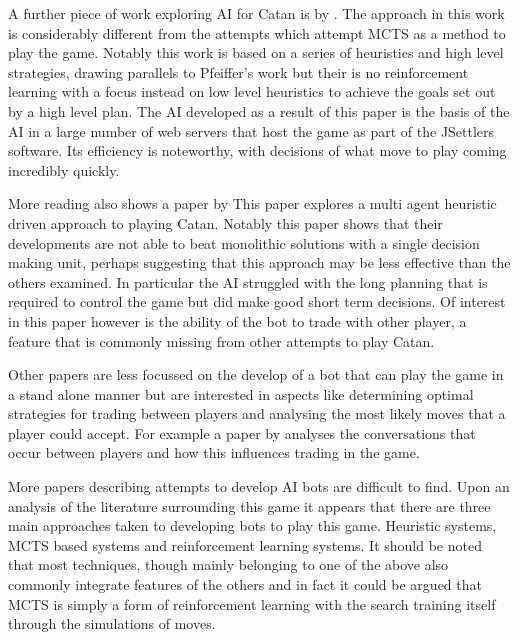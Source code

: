 \documentclass[]{article}
\begin{document}
\par A further piece of work exploring AI for Catan is by \textcite{thomas2003real}. The approach in this work is considerably different from the attempts which attempt MCTS as a method to play the game. Notably this work is based on a series of heuristics and high level strategies, drawing parallels to Pfeiffer's work but their is no reinforcement learning with a focus instead on low level heuristics to achieve the goals set out by a high level plan. The AI developed as a result of this paper is the basis of the AI in a large number of web servers that host the game as part of the JSettlers software. Its efficiency is noteworthy, with decisions of what move to play coming incredibly quickly.

\par More reading also shows a paper by \textcite{branca2007using} This paper explores a multi agent heuristic driven approach to playing Catan. Notably this paper shows that their developments are not able to beat monolithic solutions with a single decision making unit, perhaps suggesting that this approach may be less effective than the others examined. In particular the AI struggled with the long planning that is required to control the game but did make good short term decisions. Of interest in this paper however is the ability of the bot to trade with other player, a feature that is commonly missing from other attempts to play Catan.

\par Other papers are less focussed on the develop of a bot that can play the game in a stand alone manner but are interested in aspects like determining optimal strategies for trading between players and analysing the most likely moves that a player could accept. For example a paper by \textcite{afantenos2012developing} analyses the conversations that occur between players and how this influences trading in the game.

\par More papers describing attempts to develop AI bots are difficult to find. Upon an analysis of the literature surrounding this game it appears that there are three main approaches taken to developing bots to play this game. Heuristic systems, MCTS based systems and reinforcement learning systems. It should be noted that most techniques, though mainly belonging to one of the above also commonly integrate features of the others and in fact it could be argued that MCTS is simply a form of reinforcement learning with the search training itself through the simulations of moves.
\end{document}
